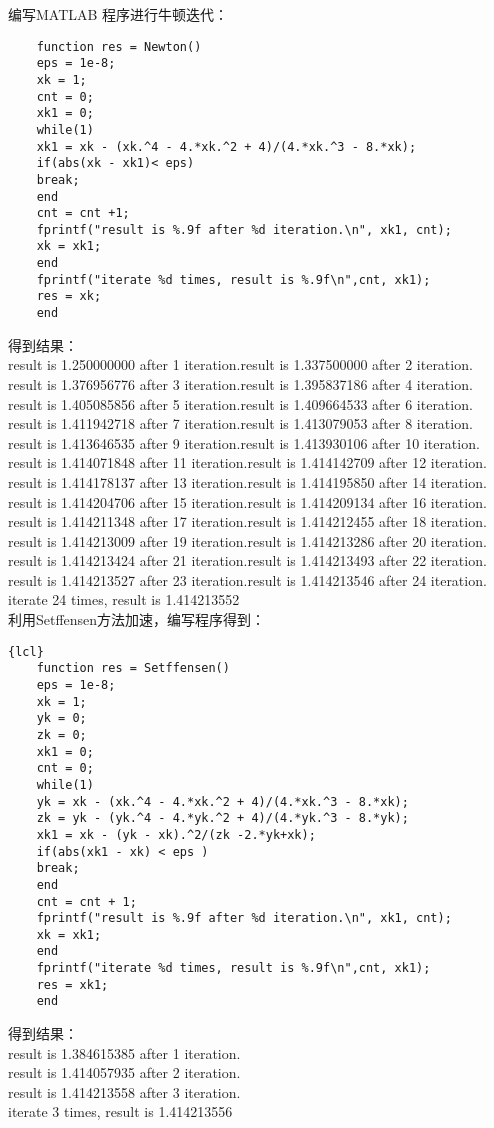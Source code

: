 \documentclass{article}
\begin{document}
\begin{itemize}
		编写MATLAB 程序进行牛顿迭代：
	\begin{lstlisting}
 	function res = Newton()
 	eps = 1e-8;
 	xk = 1;
 	cnt = 0;
 	xk1 = 0;
 	while(1)
 	xk1 = xk - (xk.^4 - 4.*xk.^2 + 4)/(4.*xk.^3 - 8.*xk);
 	if(abs(xk - xk1)< eps) 
 	break;
 	end
 	cnt = cnt +1;
 	fprintf("result is %.9f after %d iteration.\n", xk1, cnt);
 	xk = xk1;
 	end
 	fprintf("iterate %d times, result is %.9f\n",cnt, xk1);
 	res = xk;
 	end
	\end{lstlisting}
	得到结果：\\
	result is 1.250000000 after 1 iteration.\quad result is 1.337500000 after 2 iteration.\\
	result is 1.376956776 after 3 iteration.\quad result is 1.395837186 after 4 iteration.\\
	result is 1.405085856 after 5 iteration.\quad result is 1.409664533 after 6 iteration.\\
	result is 1.411942718 after 7 iteration.\quad	result is 1.413079053 after 8 iteration.\\
	result is 1.413646535 after 9 iteration.\quad	result is 1.413930106 after 10 iteration.\\
	result is 1.414071848 after 11 iteration.\quad	result is 1.414142709 after 12 iteration.\\
	result is 1.414178137 after 13 iteration.\quad	result is 1.414195850 after 14 iteration.\\
	result is 1.414204706 after 15 iteration.\quad	result is 1.414209134 after 16 iteration.\\
	result is 1.414211348 after 17 iteration.\quad	result is 1.414212455 after 18 iteration.\\
	result is 1.414213009 after 19 iteration.\quad	result is 1.414213286 after 20 iteration.\\
	result is 1.414213424 after 21 iteration.\quad	result is 1.414213493 after 22 iteration.\\
	result is 1.414213527 after 23 iteration.\quad	result is 1.414213546 after 24 iteration.\\
	iterate 24 times, result is 1.414213552\\
	利用Setffensen方法加速，编写程序得到：\\
	\begin{lstlisting}{lcl}
	function res = Setffensen()
	eps = 1e-8;
	xk = 1;
	yk = 0;
	zk = 0;
	xk1 = 0;
	cnt = 0;
	while(1)
	yk = xk - (xk.^4 - 4.*xk.^2 + 4)/(4.*xk.^3 - 8.*xk);
	zk = yk - (yk.^4 - 4.*yk.^2 + 4)/(4.*yk.^3 - 8.*yk);
	xk1 = xk - (yk - xk).^2/(zk -2.*yk+xk);
	if(abs(xk1 - xk) < eps )
	break;
	end
	cnt = cnt + 1;
	fprintf("result is %.9f after %d iteration.\n", xk1, cnt);
	xk = xk1;
	end
	fprintf("iterate %d times, result is %.9f\n",cnt, xk1);
	res = xk1;
	end
	\end{lstlisting}
	得到结果：\\
	result is 1.384615385 after 1 iteration.\\
	result is 1.414057935 after 2 iteration.\\
	result is 1.414213558 after 3 iteration.\\
	iterate 3 times, result is 1.414213556\\
	\end{itemize}	
\end{document}
